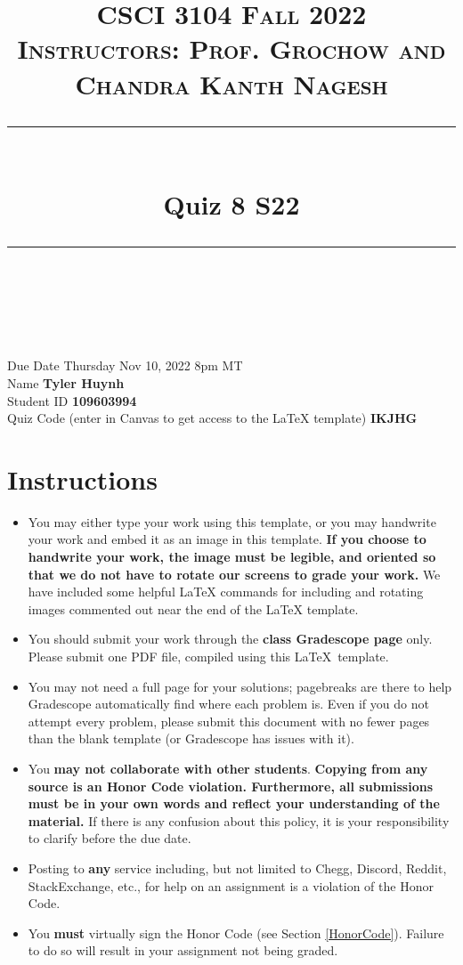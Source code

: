 \documentclass[11pt]{article}
\title{
\normalfont \normalsize 
\textsc{CSCI 3104 Fall 2022 \\ 
Instructors: Prof. Grochow and Chandra Kanth Nagesh} \\
[10pt] 
\rule{\linewidth}{0.5pt} \\[6pt] 
\huge Quiz 8 S22 \\
\rule{\linewidth}{2pt}  \\[10pt]
}
\date{}
\theoremstyle{definition}
\theoremstyle{definition}
\theoremstyle{definition}
\begin{document}

\maketitle


\noindent
Due Date \dotfill Thursday Nov 10, 2022 8pm MT \\
Name \dotfill \textbf{Tyler Huynh} \\
Student ID \dotfill \textbf{109603994} \\
Quiz Code (enter in Canvas to get access to the LaTeX template) \dotfill \textbf{IKJHG}


\tableofcontents

\section*{Instructions}
 \begin{itemize}
	\item You may either type your work using this template, or you may handwrite your work and embed it as an image in this template. \textbf{If you choose to handwrite your work, the image must be legible, and oriented so that we do not have to rotate our screens to grade your work.} We have included some helpful LaTeX commands for including and rotating images commented out near the end of the LaTeX template.
	\item You should submit your work through the \textbf{class Gradescope page} only. Please submit one PDF file, compiled using this \LaTeX \ template.
	\item You may not need a full page for your solutions; pagebreaks are there to help Gradescope automatically find where each problem is. Even if you do not attempt every problem, please submit this document with no fewer pages than the blank template (or Gradescope has issues with it).

	\item You \textbf{may not collaborate with other students}. \textbf{Copying from any source is an Honor Code violation. Furthermore, all submissions must be in your own words and reflect your understanding of the material.} If there is any confusion about this policy, it is your responsibility to clarify before the due date. 

	\item Posting to \textbf{any} service including, but not limited to Chegg, Discord, Reddit, StackExchange, etc., for help on an assignment is a violation of the Honor Code.

	\item You \textbf{must} virtually sign the Honor Code (see Section \ref{HonorCode}). Failure to do so will result in your assignment not being graded.
\end{itemize}
\end{document}
